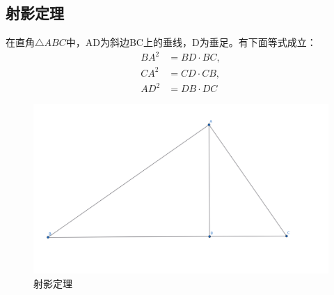 \subsection{射影定理}
\begin{theorem}[射影定理]
    在直角$\triangle ABC$中，AD为斜边BC上的垂线，D为垂足。有下面等式成立：
    $$
    \begin{aligned}
    BA^2 &= BD\cdot BC,\\ 
    CA^2 &= CD\cdot CB,\\
    AD^2 &= DB\cdot DC
    \end{aligned}
    $$
\end{theorem}
\begin{figure}[h]
    \centering
    \includegraphics[width=0.8\linewidth]{figures/射影定理.png}
    \caption{射影定理}
\end{figure}
